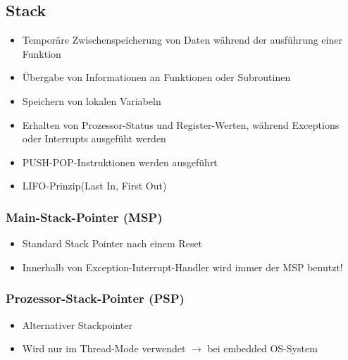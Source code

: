 \subsection{Stack}
\begin{multicols}{2}
    \begin{minipage}{0.5\textwidth}
        \begin{itemize}
            \item Temporäre Zwischenspeicherung von Daten während der ausführung einer Funktion
            \item Übergabe von Informationen an Funktionen oder Subroutinen
            \item Speichern von lokalen Variabeln
            \item Erhalten von Prozessor-Status und Register-Werten, während Exceptions oder Interrupts ausgefüht werden
            \item PUSH-POP-Instruktionen werden ausgeführt
            \item LIFO-Prinzip(Last In, First Out)
        \end{itemize}
    \end{minipage}
    
    \begin{minipage}{0.5\textwidth}
        \subsubsection{Main-Stack-Pointer (MSP)}
        \begin{itemize}
            \item Standard Stack Pointer nach einem Reset
            \item Innerhalb von Exception-Interrupt-Handler wird immer der MSP benutzt!
            \end{itemize}
        \subsubsection{Prozessor-Stack-Pointer (PSP)}
        \begin{itemize}
            \item Alternativer Stackpointer
            \item Wird nur im Thread-Mode verwendet
            \subitem $\rightarrow$ bei embedded OS-System
        \end{itemize}   
    \end{minipage}
\end{multicols}

















